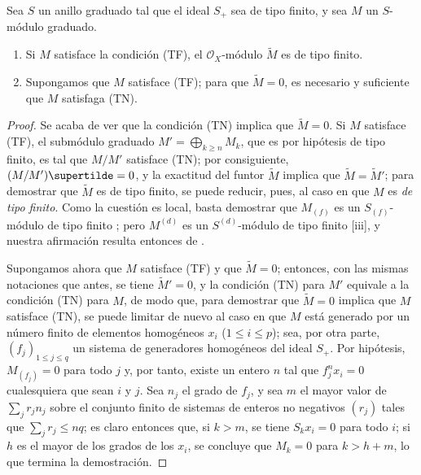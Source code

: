 \documentclass[oneside,10pt]{amsart}
\renewcommand{\leq}{\leqslant}
\renewcommand{\geq}{\geqslant}
\newcommand{\oldpage}[2][]{\marginnote{\normalfont\footnotesize\textbf{#1}~|~#2}\ignorespaces}
\let\EGAOriginalLabel\label
\renewcommand{\label}[1]{\phantomsection\EGAOriginalLabel{#1}}
\begin{document}
\begin{proposition}[2.7.3]
\label{II.2.7.3-fr}
Sea $S$ un anillo graduado tal que el ideal $S_+$ sea de tipo finito, y sea $M$ un $S$-módulo graduado.
\begin{enumerate}
  \item[{\rm(i)}] Si $M$ satisface la condición \textup{(TF)}, el $\mathcal{O}_X$-módulo $\widetilde{M}$ es de tipo finito.
  \item[{\rm(ii)}] Supongamos que $M$ satisface \textup{(TF)}; para que $\widetilde{M}=0$, es necesario y suficiente que $M$ satisfaga \textup{(TN)}.
\end{enumerate}
\end{proposition}

\begin{proof}
Se acaba de ver que la condición (TN) implica que $\widetilde{M}=0$.
Si $M$ satisface (TF), el submódulo graduado $M'=\bigoplus_{k\geq n}M_k$, que es por hipótesis de tipo finito, es tal que $M/M'$ satisface (TN); por consiguiente, $(M/M')\supertilde=0$, y la exactitud del funtor $\widetilde{M}$  implica que $\widetilde{M}=\widetilde{M}'$; para demostrar que $\widetilde{M}$ es de tipo finito, se puede reducir, pues, al caso en que $M$ es \emph{de tipo finito}.
Como la cuestión es local, basta demostrar que $M_{(f)}$ es un $S_{(f)}$-módulo de tipo finito ; pero $M^{(d)}$ es un $S^{(d)}$-módulo de tipo finito [iii], y nuestra afirmación resulta entonces de .

Supongamos ahora que $M$ satisface (TF) y que $\widetilde{M}=0$; entonces, con las mismas notaciones que antes, se tiene $\widetilde{M}'=0$, y la condición (TN) para $M'$ equivale a la condición (TN) para $M$, de modo que, para demostrar que $\widetilde{M}=0$ implica que $M$ satisface (TN), se puede limitar de nuevo al caso en que $M$ está generado por un número finito de elementos homogéneos $x_i$ ($1\leq i\leq p$); sea, por otra parte, $(f_j)_{1\leq j\leq q}$ un sistema de generadores homogéneos del ideal $S_+$.
Por hipótesis, $M_{(f_j)}=0$ para todo $j$ y, por tanto, existe un entero $n$ tal que $f_j^nx_i=0$ cualesquiera que sean $i$ y $j$.
Sea $n_j$ el grado de $f_j$, y sea $m$ el mayor valor de $\sum_jr_jn_j$ sobre el conjunto finito de sistemas de enteros no negativos $(r_j)$ tales que $\sum_jr_j\leq nq$; es claro entonces
\oldpage[II]{40}
que, si $k>m$, se tiene $S_kx_i=0$ para todo $i$; si $h$ es el mayor de los grados de los $x_i$, se concluye que $M_k=0$ para $k>h+m$, lo que termina la demostración.
\end{proof}
\end{document}
